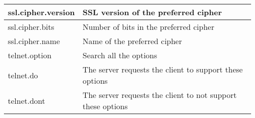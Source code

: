 \begin{table}[H]
{\begin{tabular}{|l|l|}
\hline
ssl.cipher.version                                                              & SSL version of the preferred cipher                                                                                                                                                                                                                                                                                                                                         \\ 
\hline
ssl.cipher.bits                                                                 & Number of bits in the preferred cipher                                                                                                                                                                                                                                                                                                                                      \\ 
\hline
ssl.cipher.name                                                                 & Name of the preferred cipher                                                                                                                                                                                                                                                                                                                                                \\ 
\hline
telnet.option                                                                   & Search all the options                                                                                                                                                                                                                                                                                                                                                      \\ 
\hline
telnet.do                                                                       & The server requests the client to support these options                                                                                                                                                                                                                                                                                                                     \\ 
\hline
telnet.dont                                                                     & The server requests the client to not support these options                                                                                                                                                                                                                                                                                                                 \\ 

\end{tabular}}
\end{table}
